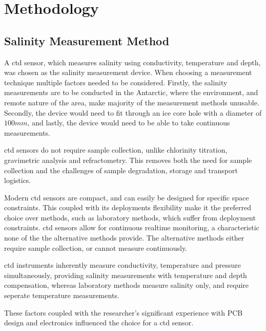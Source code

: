 \chapter{Methodology}

\section{Salinity Measurement Method}
A \gls{ctd} sensor, which measures salinity using conductivity, temperature and depth, was chosen as the salinity measurement device.
When choosing a measurement technique multiple factors needed to be considered.
Firstly, the salinity measurements are to be conducted in the Antarctic, where the environment, and remote nature of the area, make majority of the measurement methods unusable.
Secondly, the device would need to fit through an ice core hole with a diameter of $100mm$, and lastly, the device would need to be able to take continuous measurements.

\gls{ctd} sensors do not require sample collection, unlike chlorinity titration, gravimetric analysis and refractometry.
This removes both the need for sample collection and the challenges of sample degradation, storage and transport logistics.

Modern \gls{ctd} sensors are compact, and can easily be designed for specific space constraints.
This coupled with its deployments flexibility make it the preferred choice over methods, such as laboratory methods, which suffer from deployment constraints.
\gls{ctd} sensors allow for continuous realtime monitoring, a characteristic none of the the alternative methods provide.
The alternative methods either require sample collection, or cannot measure continuously.

\gls{ctd} instruments inherently measure conductivity, temperature and pressure simultaneously, providing salinity measurements with temperature and depth compensation, whereas laboratory methods measure salinity only, and require seperate temperature measurements.


These factors coupled with the researcher's significant experience with PCB design and electronics influenced the choice for a \gls{ctd} sensor.

